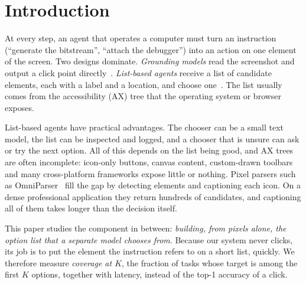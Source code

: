 \section{Introduction}
\label{sec:intro}

At every step, an agent that operates a computer must turn an instruction (``generate the bitstream'', ``attach
the debugger'') into an action on one element of the screen. Two designs dominate. \emph{Grounding models} read the
screenshot and output a click point directly~\cite{gou2025uground,wu2024osatlas,wu2025guiactor,xie2025jedi}.
\emph{List-based agents} receive a list of candidate elements, each with a label and a location, and choose
one~\cite{deng2023mind2web,lu2024omniparser}. The list usually comes from the accessibility (AX) tree that the
operating system or browser exposes.

List-based agents have practical advantages. The chooser can be a small text model, the list can be inspected and
logged, and a chooser that is unsure can ask or try the next option. All of this depends on the list being good,
and AX trees are often incomplete: icon-only buttons, canvas content, custom-drawn toolbars and many
cross-platform frameworks expose little or nothing. Pixel parsers such as OmniParser~\cite{lu2024omniparser} fill
the gap by detecting elements and captioning each icon. On a dense professional application they return hundreds
of candidates, and captioning all of them takes longer than the decision itself.

This paper studies the component in between: \emph{building, from pixels alone, the option list that a separate
model chooses from}. Because our system never clicks, its job is to put the element the instruction refers to on a
short list, quickly. We therefore measure \emph{coverage at $K$}, the fraction of tasks whose target is among the
first $K$ options, together with latency, instead of the top-1 accuracy of a click.

